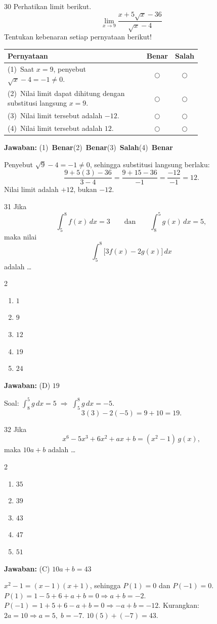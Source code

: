 \documentclass[11pt]{article}
\newcommand{\jawaban}[1]{%
  \noindent\colorbox{gold!30}{\parbox{\dimexpr\linewidth-2\fboxsep\relax}{%
    \textbf{Jawaban:} #1}}\par\smallskip}
\newenvironment{pilB}{%
  \par\smallskip\begin{multicols}{2}
  \begin{enumerate}[label=(\Alph*),leftmargin=*,itemsep=1pt,topsep=3pt]}%
  {\end{enumerate}\end{multicols}}
\begin{document}
\begin{soal}{30}
Perhatikan limit berikut.
\[
  \lim_{x\to 9}\frac{x+5\sqrt{x}-36}{\sqrt{x}-4}
\]
Tentukan kebenaran setiap pernyataan berikut!

\par\smallskip
{\renewcommand{\arraystretch}{1.4}%
\begin{tabular}{@{}p{0.76\linewidth}cc@{}}
\hline
\textbf{Pernyataan} & \textbf{Benar} & \textbf{Salah}\\
\hline
(1)~Saat $x=9$, penyebut $\sqrt{x}-4=-1\neq0$.
  & $\bigcirc$ & $\bigcirc$\\
(2)~Nilai limit dapat dihitung dengan substitusi langsung $x=9$.
  & $\bigcirc$ & $\bigcirc$\\
(3)~Nilai limit tersebut adalah $-12$.
  & $\bigcirc$ & $\bigcirc$\\
(4)~Nilai limit tersebut adalah $12$.
  & $\bigcirc$ & $\bigcirc$\\
\hline
\end{tabular}}
\end{soal}
\begin{pembox}
\jawaban{(1)~\textbf{Benar}\quad(2)~\textbf{Benar}\quad(3)~\textbf{Salah}\quad(4)~\textbf{Benar}}
Penyebut $\sqrt{9}-4=-1\neq0$, sehingga substitusi langsung berlaku:
\[ \frac{9+5(3)-36}{3-4}=\frac{9+15-36}{-1}=\frac{-12}{-1}=12. \]
Nilai limit adalah $+12$, bukan $-12$.
\end{pembox}

\begin{soal}{31}
Jika
\[
  \int_5^8 f(x)\,dx=3
  \qquad\text{dan}\qquad
  \int_8^5 g(x)\,dx=5,
\]
maka nilai
\[
  \int_5^8\bigl[3f(x)-2g(x)\bigr]\,dx
\]
adalah \ldots
\begin{pilB}
  \item $1$ \item $9$ \item $12$ \item $19$ \item $24$
\end{pilB}
\end{soal}
\begin{pembox}
\jawaban{(D) $19$}
Soal: $\int_8^5 g\,dx=5\;\Rightarrow\;\int_5^8 g\,dx=-5$.
\[ 3(3)-2(-5)=9+10=19. \]
\end{pembox}

\begin{soal}{32}
Jika
\[
  x^6-5x^3+6x^2+ax+b=(x^2-1)\,g(x),
\]
maka $10a+b$ adalah \ldots
\begin{pilB}
  \item $35$ \item $39$ \item $43$ \item $47$ \item $51$
\end{pilB}
\end{soal}
\begin{pembox}
\jawaban{(C) $10a+b=43$}
$x^2-1=(x-1)(x+1)$, sehingga $P(1)=0$ dan $P(-1)=0$.
$P(1)=1-5+6+a+b=0\Rightarrow a+b=-2$.
$P(-1)=1+5+6-a+b=0\Rightarrow -a+b=-12$.
Kurangkan: $2a=10\Rightarrow a=5,\;b=-7$.
$10(5)+(-7)=43$.
\end{pembox}
\end{document}
